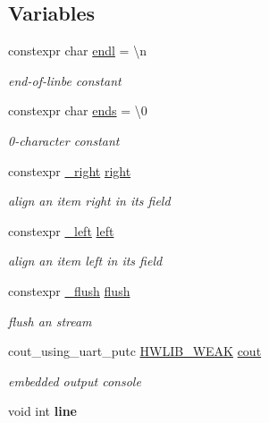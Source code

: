 \subsection*{Variables}
\begin{DoxyCompactItemize}
\item 
constexpr char \hyperlink{namespacehwlib_a89ce110cc897f61657f1edca18e4cef7}{endl} = \textquotesingle{}\textbackslash{}n\textquotesingle{}\hypertarget{namespacehwlib_a89ce110cc897f61657f1edca18e4cef7}{}\label{namespacehwlib_a89ce110cc897f61657f1edca18e4cef7}

\begin{DoxyCompactList}\small\item\em end-\/of-\/linbe constant \end{DoxyCompactList}\item 
constexpr char \hyperlink{namespacehwlib_ac708935d0fc9beb71bb55a7c35e69a16}{ends} = \textquotesingle{}\textbackslash{}0\textquotesingle{}\hypertarget{namespacehwlib_ac708935d0fc9beb71bb55a7c35e69a16}{}\label{namespacehwlib_ac708935d0fc9beb71bb55a7c35e69a16}

\begin{DoxyCompactList}\small\item\em 0-\/character constant \end{DoxyCompactList}\item 
constexpr \hyperlink{structhwlib_1_1__right}{\+\_\+right} \hyperlink{namespacehwlib_a26a6aead1d4dc1a990ab77bf2b730740}{right}
\begin{DoxyCompactList}\small\item\em align an item right in its field \end{DoxyCompactList}\item 
constexpr \hyperlink{structhwlib_1_1__left}{\+\_\+left} \hyperlink{namespacehwlib_a7d9a4ef3e66da75048c5b3e67cf401d8}{left}
\begin{DoxyCompactList}\small\item\em align an item left in its field \end{DoxyCompactList}\item 
constexpr \hyperlink{structhwlib_1_1__flush}{\+\_\+flush} \hyperlink{namespacehwlib_a648fe94ca9899747a632c23f97007732}{flush}
\begin{DoxyCompactList}\small\item\em flush an stream \end{DoxyCompactList}\item 
cout\+\_\+using\+\_\+uart\+\_\+putc \hyperlink{hwlib-defines_8hpp_a04be4340016df60d6636c1d1c6d94fc9}{H\+W\+L\+I\+B\+\_\+\+W\+E\+AK} \hyperlink{namespacehwlib_ac985c212834e4eb219aedede6efff2dc}{cout}
\begin{DoxyCompactList}\small\item\em embedded output console \end{DoxyCompactList}\item 
void int {\bfseries line}
\end{DoxyCompactItemize}
